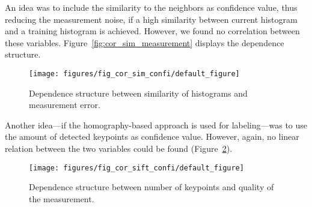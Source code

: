 An idea was to include the similarity to the neighbors as confidence
value, thus reducing the measurement noise, if a high similarity
between current histogram and a training histogram is
achieved. However, we found no correlation between these
variables. Figure~\ref{fig:cor_sim_measurement} displays the
dependence structure.

\begin{figure}[h!]
\begin{center}
\texttt{[image: figures/fig\_cor\_sim\_confi/default\_figure]}
\caption{{\label{fig:cor_sim_confi} Dependence structure between similarity of histograms and
    measurement error.%
}}
\end{center}
\end{figure}

Another idea---if the homography-based approach is used for
labeling---was to use the amount of detected keypoints as confidence
value. However, again, no linear relation between the two variables
could be found (Figure~\ref{fig:cor_sift_confi}).

\begin{figure}[h!]
\begin{center}
\texttt{[image: figures/fig\_cor\_sift\_confi/default\_figure]}
\caption{{\label{fig:cor_sift_confi} Dependence structure between number of keypoints and quality
    of the measurement.%
}}
\end{center}
\end{figure}

